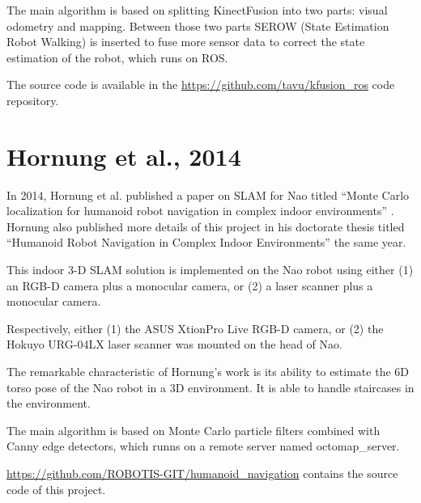 \documentclass[11pt]{amsart}
\begin{document}
The main algorithm is based on splitting KinectFusion into two parts: visual odometry and mapping. Between those two parts SEROW (State Estimation Robot Walking) is inserted to fuse more sensor data to correct the state estimation of the robot, which runs on ROS.

The source code is available in the \url{https://github.com/tavu/kfusion_ros} code repository.

\section{Hornung et al., 2014}

In 2014, Hornung et al. published a paper on SLAM for Nao titled ``Monte Carlo localization for humanoid robot navigation in complex indoor environments'' \cite{hornung2014monte}. Hornung also published more details of this project in his doctorate thesis titled ``Humanoid Robot Navigation in Complex Indoor Environments'' \cite{hornung2014humanoid} the same year.

This indoor 3-D SLAM solution is implemented on the Nao robot using either (1) an RGB-D camera plus a monocular camera, or (2) a laser scanner plus a monocular camera.

Respectively, either (1) the ASUS XtionPro Live RGB-D camera, or (2) the Hokuyo URG-04LX laser scanner was mounted on the head of Nao.

The remarkable characteristic of Hornung's work is its ability to estimate the 6D torso pose of the Nao robot in a 3D environment. It is able to handle staircases in the environment.

The main algorithm is based on Monte Carlo particle filters combined with Canny edge detectors, which runns on a remote server named octomap\_server.

\url{https://github.com/ROBOTIS-GIT/humanoid_navigation} contains the source code of this project.



\end{document}
